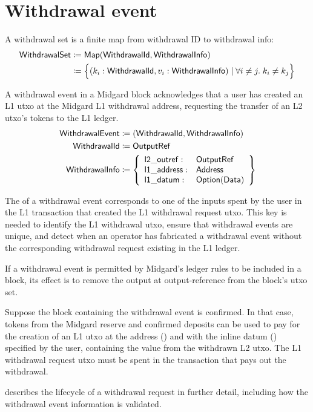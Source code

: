 \documentclass[../midgard.tex]{subfiles}
\begin{document}
\section{Withdrawal event}
\label{h:withdrawal-event}

A withdrawal set is a finite map from withdrawal ID to withdrawal info:
\begin{align*}
    \mathsf{WithdrawalSet} &\coloneq \mathsf{Map(WithdrawalId, WithdrawalInfo)} \\
      &\coloneq \Bigl\{
        (k_i: \mathsf{WithdrawalId}, v_i: \mathsf{WithdrawalInfo}) \mid \forall i \neq j.\; k_i \neq k_j
    \Bigr\}
\end{align*}

A withdrawal event in a Midgard block acknowledges that a user has created an L1 utxo at the Midgard L1 withdrawal address, requesting the transfer of an L2 utxo's tokens to the L1 ledger.
\begin{align*}
    \mathsf{WithdrawalEvent} &\coloneq \mathsf{(WithdrawalId, WithdrawalInfo)} \\
    \mathsf{WithdrawalId} &\coloneq \mathsf{OutputRef} \\
    \mathsf{WithdrawalInfo} &\coloneq \left\{
        \begin{array}{ll}
            \mathsf{l2\_outref} :& \mathsf{OutputRef} \\
            \mathsf{l1\_address} : & \mathsf{Address} \\
            \mathsf{l1\_datum} : & \mathsf{Option(Data)}
        \end{array} \right\}
\end{align*}

The  of a withdrawal event corresponds to one of the inputs spent by the user in the L1 transaction that created the L1 withdrawal request utxo.
This key is needed to identify the L1 withdrawal utxo, ensure that withdrawal events are unique, and detect when an operator has fabricated a withdrawal event without the corresponding withdrawal request existing in the L1 ledger.

If a withdrawal event is permitted by Midgard's ledger rules to be included in a block, its effect is to remove the output at output-reference  from the block's utxo set.

Suppose the block containing the withdrawal event is confirmed.
In that case, tokens from the Midgard reserve and confirmed deposits can be used to pay for the creation of an L1 utxo at the address () and with the inline datum () specified by the user, containing the value from the withdrawn L2 utxo.
The L1 withdrawal request utxo must be spent in the transaction that pays out the withdrawal.

 describes the lifecycle of a withdrawal request in further detail, including how the withdrawal event information is validated.
\end{document}
